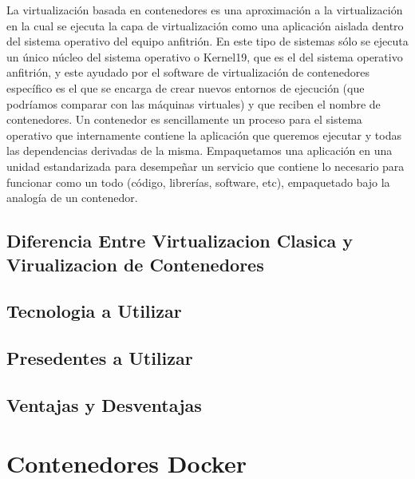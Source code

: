 \documentclass[%
 reprint,
 amsmath,amssymb,
 aps,
]{revtex4-1}
\begin{document}
La virtualización basada en contenedores es una aproximación a la virtualización en la cual se
ejecuta la capa de virtualización como una aplicación aislada dentro del sistema operativo del
equipo anfitrión. En este tipo de sistemas sólo se ejecuta un único núcleo del sistema operativo o
Kernel19, que es el del sistema operativo anfitrión, y este ayudado por el software de virtualización
de contenedores específico es el que se encarga de crear nuevos entornos de ejecución (que
podríamos comparar con las máquinas virtuales) y que reciben el nombre de contenedores.
Un contenedor es sencillamente un proceso para el sistema operativo que internamente contiene
la aplicación que queremos ejecutar y todas las dependencias derivadas de la misma.
Empaquetamos una aplicación en una unidad estandarizada para desempeñar un servicio que
contiene lo necesario para funcionar como un todo (código, librerías, software, etc), empaquetado
bajo la analogía de un contenedor.

\subsection{Diferencia Entre Virtualizacion Clasica y Virualizacion de Contenedores}
\subsection{Tecnologia a Utilizar}
\subsection{Presedentes a Utilizar}
\subsection{Ventajas y Desventajas}


\section{Contenedores Docker}\label{sec:6}
\end{document}
